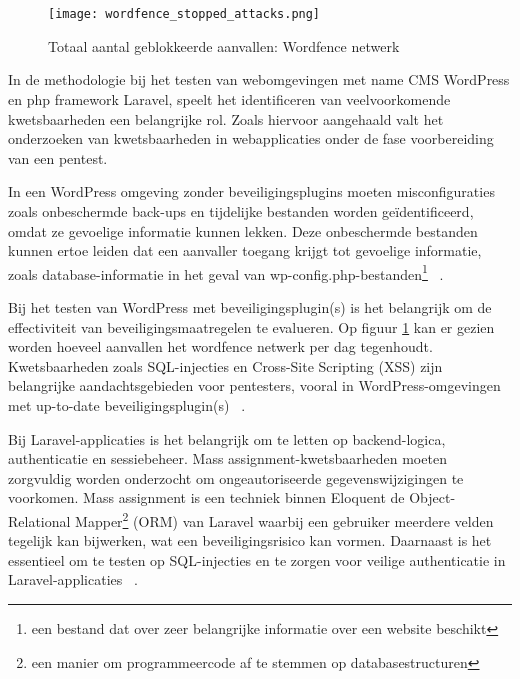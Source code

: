 \section{}
\label{sec:Webomgevingen}

\subsection{}
\label{sec:Veiligheidskwetsbaarheden in Webomgevingen}
\begin{figure}
    \centering
    \texttt{[image: wordfence\_stopped\_attacks.png]}
    \caption[Totaal aantal geblokkeerde aanvallen: Wordfence netwerk]{Totaal aantal geblokkeerde aanvallen: Wordfence netwerk}
    \label{fig:stopped_attacks}
\end{figure}

In de methodologie bij het testen van webomgevingen met name CMS WordPress en php framework Laravel, speelt het identificeren van veelvoorkomende 
kwetsbaarheden een belangrijke rol. Zoals hiervoor aangehaald valt het onderzoeken van kwetsbaarheden in webapplicaties onder 
de fase voorbereiding van een pentest.

In een WordPress omgeving zonder beveiligingsplugins moeten misconfiguraties zoals onbeschermde back-ups 
en tijdelijke bestanden worden geïdentificeerd, omdat ze gevoelige informatie kunnen lekken. Deze onbeschermde bestanden kunnen 
ertoe leiden dat een aanvaller toegang krijgt tot gevoelige informatie, zoals database-informatie in het geval van 
wp-config.php-bestanden\footnote{een bestand dat over zeer belangrijke informatie over een website beschikt} 
~\autocite{DalalanaBertoglio2017}.

Bij het testen van WordPress met beveiligingsplugin(s) is het belangrijk om de effectiviteit van beveiligingsmaatregelen te 
evalueren. Op figuur \ref{fig:stopped_attacks} kan er gezien worden hoeveel aanvallen het wordfence netwerk per dag tegenhoudt. Kwetsbaarheden 
zoals SQL-injecties en Cross-Site Scripting (XSS) zijn belangrijke aandachtsgebieden voor pentesters, vooral in WordPress-omgevingen 
met up-to-date beveiligingsplugin(s) ~\autocite{Albahar2022}.

Bij Laravel-applicaties is het belangrijk om te letten op backend-logica, authenticatie en sessiebeheer. 
Mass assignment-kwetsbaarheden moeten zorgvuldig worden onderzocht om ongeautoriseerde gegevenswijzigingen te voorkomen.
Mass assignment is een techniek binnen Eloquent de Object-Relational Mapper\footnote{een manier om programmeercode af 
te stemmen op databasestructuren} (ORM) van Laravel  waarbij een gebruiker meerdere velden tegelijk kan bijwerken, wat een beveiligingsrisico kan vormen. 
Daarnaast is het essentieel om te testen op SQL-injecties en te zorgen voor veilige authenticatie in Laravel-applicaties 
~\autocite{Altulaihan2023}.


